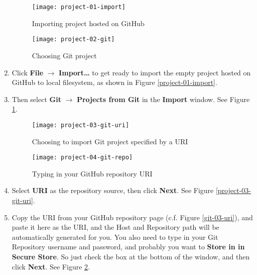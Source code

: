 \begin{enumerate}

\begin{figure}[t]
\hspace{-2em}
\begin{minipage}{0.5\textwidth}
\centering
\texttt{[image: project-01-import]}
\caption{Importing project hosted on GitHub\label{project-01-import}}
\end{minipage}
\hfill
\begin{minipage}{0.5\textwidth}
\centering
\texttt{[image: project-02-git]}
\caption{Choosing Git project\label{project-02-git}}
\end{minipage}
\hspace{-2em}
\end{figure}

\item Click \textbf{File} $\rightarrow$ \textbf{Import\ldots} to get ready to
import the empty project hosted on GitHub to local filesystem, as shown in
Figure \ref{project-01-import}.

\item Then select \textbf{Git} $\rightarrow$ \textbf{Projects from Git} in the
\textbf{Import} window. See Figure \ref{project-02-git}.

\begin{figure}[t]
\hspace{-2em}
\begin{minipage}{0.5\textwidth}
\centering
\texttt{[image: project-03-git-uri]}
\caption{Choosing to import Git project specified by a URI\label{project-03-git-uri}}
\end{minipage}
\hfill
\begin{minipage}{0.5\textwidth}
\centering
\texttt{[image: project-04-git-repo]}
\caption{Typing in your GitHub repository URI\label{project-04-git-repo}}
\end{minipage}
\hspace{-2em}
\end{figure}

\item Select \textbf{URI} as the repository source, then click \textbf{Next}.
See Figure \ref{project-03-git-uri}.

\item Copy the URI from your GitHub repository page (c.f. Figure
\ref{git-03-uri}), and paste it here as the URI, and the Host and Repository
path will be automatically generated for you. You also need to type in your Git
Repository username and password, and probably you want to \textbf{Store in in
Secure Store}. So just check the box at the bottom of the window, and then click
\textbf{Next}. See Figure \ref{project-04-git-repo}.


\end{enumerate}
